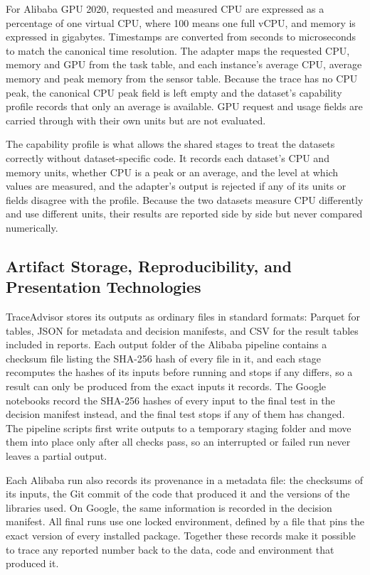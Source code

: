 For Alibaba GPU 2020, requested and measured CPU are expressed as a percentage of one virtual CPU, where 100 means one full vCPU, and memory is expressed in gigabytes. Timestamps are converted from seconds to microseconds to match the canonical time resolution. The adapter maps the requested CPU, memory and GPU from the task table, and each instance's average CPU, average memory and peak memory from the sensor table. Because the trace has no CPU peak, the canonical CPU peak field is left empty and the dataset's capability profile records that only an average is available. GPU request and usage fields are carried through with their own units but are not evaluated.

The capability profile is what allows the shared stages to treat the datasets correctly without dataset-specific code. It records each dataset's CPU and memory units, whether CPU is a peak or an average, and the level at which values are measured, and the adapter's output is rejected if any of its units or fields disagree with the profile. Because the two datasets measure CPU differently and use different units, their results are reported side by side but never compared numerically.

\subsection{Artifact Storage, Reproducibility, and Presentation Technologies}\label{sec:3.5}

TraceAdvisor stores its outputs as ordinary files in standard formats: Parquet for tables, JSON for metadata and decision manifests, and CSV for the result tables included in reports. Each output folder of the Alibaba pipeline contains a checksum file listing the SHA-256 hash of every file in it, and each stage recomputes the hashes of its inputs before running and stops if any differs, so a result can only be produced from the exact inputs it records. The Google notebooks record the SHA-256 hashes of every input to the final test in the decision manifest instead, and the final test stops if any of them has changed. The pipeline scripts first write outputs to a temporary staging folder and move them into place only after all checks pass, so an interrupted or failed run never leaves a partial output.

Each Alibaba run also records its provenance in a metadata file: the checksums of its inputs, the Git commit of the code that produced it and the versions of the libraries used. On Google, the same information is recorded in the decision manifest. All final runs use one locked environment, defined by a file that pins the exact version of every installed package. Together these records make it possible to trace any reported number back to the data, code and environment that produced it.

